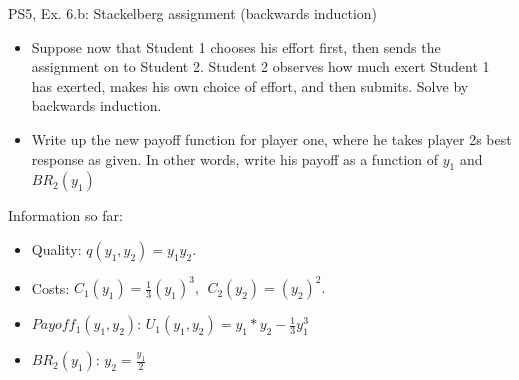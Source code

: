 \begin{frame}{PS5, Ex. 6.b: Stackelberg assignment (backwards induction)}
    \begin{itemize}
    \item[(b)] Suppose now that Student 1 chooses his effort first, then sends the assignment on to Student 2. Student 2 observes how much exert Student 1 has exerted, makes his own choice of effort, and then submits. Solve by backwards induction.
    \end{itemize}
    \vfill\null
  \begin{multicols}{2}
    \begin{itemize}
      \item[(Step 1)] Write up the new payoff function for player one, where he takes player 2s best response as given. In other words, write his payoff as a function of \begin{math}y_1\end{math} and \begin{math}BR_2(y_1)\end{math}
    \end{itemize}
    \vfill\null \columnbreak
    Information so far:
    \begin{itemize}
        \item[1] Quality: $q(y_1, y_2) = y_1y_2.$\\
        \item[2] Costs: $C_1(y_1) = \frac{1}{3}(y_1)^3,\ \ C_2(y_2) = (y_2)^2.$\\
        \item[3] $Payoff_1(y_1,y_2)$: $U_1(y_1,y_2) = y_1*y_2-\frac{1}{3}y_1^3$ \\
        \item[4] $BR_2(y_1)$: $y_2 = \frac{y_1}{2}$ \\
    \end{itemize}
    \vfill\null
  \end{multicols}
\end{frame}

